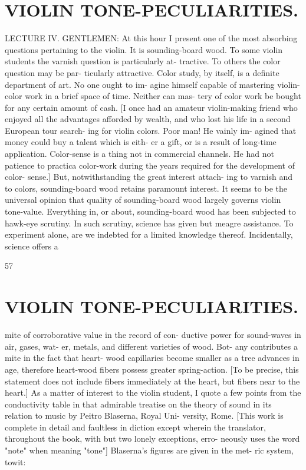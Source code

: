 \documentclass{article}
\begin{document}
\section*{VIOLIN TONE-PECULIARITIES.}
LECTURE IV. GENTLEMEN: At this hour I present one of the most absorbing questions pertaining to the violin. It is sounding-board wood. To some violin students the varnish question is particularly at- tractive. To others the color question may be par- ticularly attractive. Color study, by itself, is a definite department of art. No one ought to im- agine himself capable of mastering violin-color work in a brief space of time. Neither can mas- tery of color work be bought for any certain amount of cash. [I once had an amateur violin-making friend who enjoyed all the advantages afforded by wealth, and who lost his life in a second European tour search- ing for violin colors. Poor man! He vainly im- agined that money could buy a talent which is eith- er a gift, or is a result of long-time application. Color-sense is a thing not in commercial channels. He had not patience to practica color-work during the years required for the development of color- sense.] But, notwithstanding the great interest attach- ing to varnish and to colors, sounding-board wood retains paramount interest. It seems to be the universal opinion that quality of sounding-board wood largely governs violin tone-value. Everything in, or about, sounding-board wood has been subjected to hawk-eye scrutiny. In such scrutiny, science has given but meagre assistance. To experiment alone, are we indebted for a limited knowledge thereof. Incidentally, science offers a

57

\section*{VIOLIN TONE-PECULIARITIES.}
mite of corroborative value in the record of con- ductive power for sound-waves in air, gases, wat- er, metals, and different varieties of wood. Bot- any contributes a mite in the fact that heart- wood capillaries become smaller as a tree advances in age, therefore heart-wood fibers possess greater spring-action. [To be precise, this statement does not include fibers immediately at the heart, but fibers near to the heart.] As a matter of interest to the violin student, I quote a few points from the conductivity table in that admirable treatise on the theory of sound in its relation to music by Peitro Blaserna, Royal Uni- versity, Rome. [This work is complete in detail and faultless in diction except wherein the translator, throughout the book, with but two lonely exceptions, erro- neously uses the word "note" when meaning "tone"] Blaserna's figures are given in the met- ric system, towit:
\end{document}
